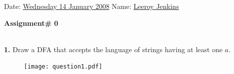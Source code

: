 \documentclass [12pt,psfig]{article}
\begin{document}
\def\date{\begin{flushright}
\today
\end{flushright}}

\vspace{0.25in}
%

\def\set#1{\lbrace #1 \rbrace}

\topmargin 20pt
\indent \indent Date: \underline{Wednesday 14 January 2008}
\indent\indent\indent\indent\indent
Name: \underline{Leeroy Jenkins}
\begin{center}
\rm\LARGE
\bf Assignment\# 0\\
\normalsize
\end{center}
\noindent
\\
\textbf{1.} Draw a DFA that accepts the language of strings having at least one 
$a$.
\begin{figure}[htp]
\centering
\texttt{[image: question1.pdf]}
\end{figure}
\end{document}
